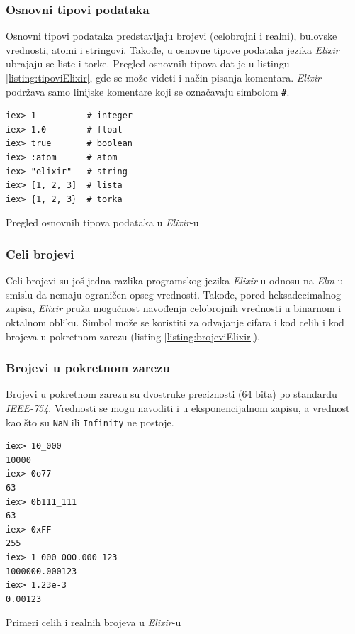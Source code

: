 \documentclass[12pt,oneside]{memoir}
\begin{document}
\subsubsection{Osnovni tipovi podataka}
Osnovni tipovi podataka predstavljaju brojevi (celobrojni i realni), bulovske
vrednosti, atomi i stringovi. Takođe, u osnovne tipove podataka jezika \emph{Elixir} ubrajaju se liste i torke. Pregled
osnovnih tipova dat je u listingu \ref{listing:tipoviElixir}, gde se može videti i način pisanja
komentara. \emph{Elixir} podržava samo linijske komentare koji se označavaju simbolom \texttt{\textbf{\#}}.
\begin{listing}[!h]
\begin{verbatim}
iex> 1          # integer
iex> 1.0        # float
iex> true       # boolean 
iex> :atom      # atom
iex> "elixir"   # string
iex> [1, 2, 3]  # lista
iex> {1, 2, 3}  # torka
\end{verbatim}
\caption{Pregled osnovnih tipova podataka u \emph{Elixir}-u}
\label{listing:tipoviElixir}
\end{listing}

\subsubsection{Celi brojevi}
Celi brojevi su još jedna razlika programskog jezika \emph{Elixir} u odnosu na \emph{Elm}
u smislu da nemaju ograničen opseg vrednosti. Takođe, pored
heksadecimalnog zapisa, \emph{Elixir} pruža mogućnost navođenja celobrojnih vrednosti u binarnom i 
oktalnom obliku. Simbol \texttt{\textbf{\textunderscore}} može se koristiti za odvajanje 
cifara i kod celih i kod brojeva u pokretnom zarezu (listing \ref{listing:brojeviElixir}).
\subsubsection{Brojevi u pokretnom zarezu}
Brojevi u pokretnom zarezu su dvostruke preciznosti (64 bita) po standardu \emph{IEEE-754}.
Vrednosti se mogu navoditi i u eksponencijalnom zapisu, a vrednost kao što su \texttt{NaN}
ili \texttt{Infinity} ne postoje.
\begin{listing}[!h]
\begin{verbatim}
iex> 10_000
10000
iex> 0o77
63
iex> 0b111_111
63
iex> 0xFF
255
iex> 1_000_000.000_123
1000000.000123
iex> 1.23e-3
0.00123
\end{verbatim}
\caption{Primeri celih i realnih brojeva u \emph{Elixir}-u}
\label{listing:brojeviElixir}
\end{listing}
\end{document}
